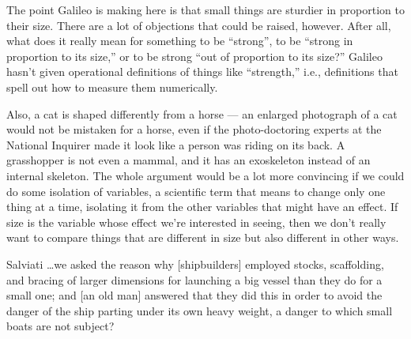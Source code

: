The point Galileo is making here is that small things are
sturdier in proportion to their size. There are a lot of
objections that could be raised, however. After all, what
does it really mean for something to be ``strong'', to be
``strong in proportion to its size,'' or to be strong ``out
of proportion to its size?'' Galileo hasn't given
operational definitions of things like ``strength,'' i.e.,
definitions that spell out how to measure them numerically.

Also, a cat is shaped differently from a horse --- an
enlarged photograph of a cat would not be mistaken for a
horse, even if the photo-doctoring experts at the National
Inquirer made it look like a person was riding on its back.
A grasshopper is not even a mammal, and it has an exoskeleton
instead of an internal skeleton. The whole argument would be
a lot more convincing if we could do some isolation of
variables, a scientific term that means to change only one
thing at a time, isolating it from the other variables that
might have an effect. If size is the variable whose effect
we're interested in seeing, then we don't really want to
compare things that are different in size but also
different in other ways.


\begin{dialogline}{Salviati} \ldots we asked the reason why [shipbuilders] employed
stocks, scaffolding, and bracing of larger dimensions for
launching a big vessel than they do for a small one; and [an
old man] answered that they did this in order to avoid the
danger of the ship parting under its own heavy weight, a
danger to which small boats are not subject?
\end{dialogline}

